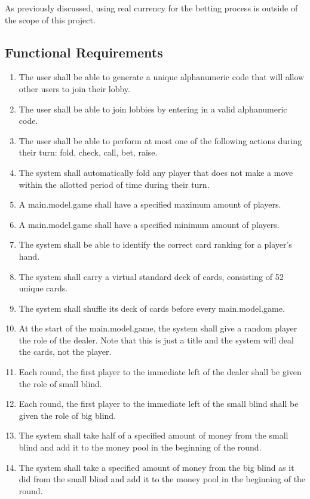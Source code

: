 \documentclass[12pt, titlepage]{article}
\begin{document}
    As previously discussed, using real currency for the betting process is outside of the scope of this project.
    

\subsection{Functional Requirements}
    \begin{enumerate}[label=FR\arabic*.]
        \item The user shall be able to generate a unique alphanumeric code that will allow other users to join their lobby.
        \item The user shall be able to join lobbies by entering in a valid alphanumeric code.
        \item The user shall be able to perform at most one of the following actions during their turn: fold, check, call, bet, raise.
        \item The system shall automatically fold any player that does not make a move within the allotted period of time during their turn.
        \item A main.model.game shall have a specified maximum amount of players.
        \item A main.model.game shall have a specified minimum amount of players.
        \item The system shall be able to identify the correct card ranking for a player's hand.
        \item The system shall carry a virtual standard deck of cards, consisting of 52 unique cards.
        \item The system shall shuffle its deck of cards before every main.model.game.
        \item At the start of the main.model.game, the system shall give a random player the role of the dealer. Note that this is just a title and the system will deal the cards, not the player.
        \item Each round, the first player to the immediate left of the dealer shall be given the role of small blind.
        \item Each round, the first player to the immediate left of the small blind shall be given the role of big blind.
        \item The system shall take half of a specified amount of money from the small blind and add it to the money pool in the beginning of the round.
        \item The system shall take a specified amount of money from the big blind as it did from the small blind and add it to the money pool in the beginning of the round.

\end{enumerate}
\end{document}
